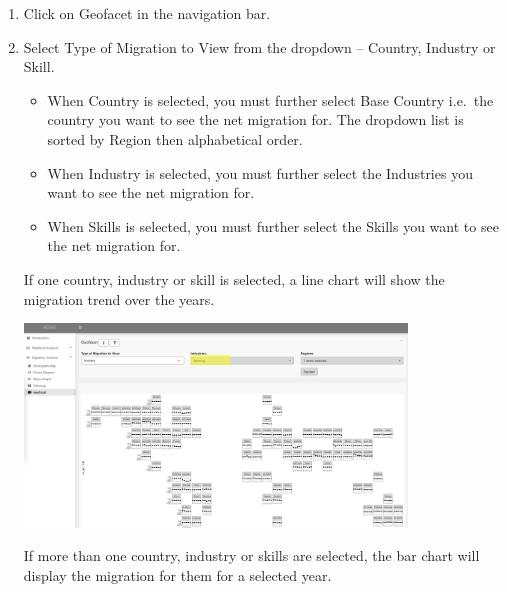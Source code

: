 \documentclass[
]{article}
\providecommand{\tightlist}{%
  \setlength{\itemsep}{0pt}\setlength{\parskip}{0pt}}
\begin{document}
\begin{enumerate}
\def\labelenumi{\arabic{enumi}.}
\item
  Click on Geofacet in the navigation bar.
\item
  Select Type of Migration to View from the dropdown -- Country,
  Industry or Skill.

  \begin{itemize}
  \tightlist
  \item
    When Country is selected, you must further select Base Country
    i.e.~the country you want to see the net migration for. The dropdown
    list is sorted by Region then alphabetical order.
  \item
    When Industry is selected, you must further select the Industries
    you want to see the net migration for.
  \item
    When Skills is selected, you must further select the Skills you want
    to see the net migration for.
  \end{itemize}

  If one country, industry or skill is selected, a line chart will show
  the migration trend over the years.

  \includegraphics[width=0.8\textwidth,height=\textheight]{Images/13-facet-line.png}

  If more than one country, industry or skills are selected, the bar
  chart will display the migration for them for a selected year.


\end{enumerate}
\end{document}
